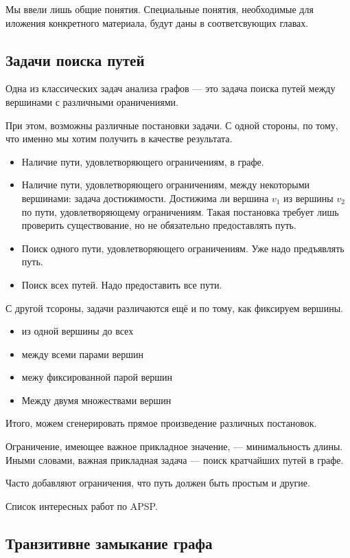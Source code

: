 Мы ввели лишь общие понятия.
Специальные понятия, необходимые для иложения конкретного материала, будут даны в соответсвующих главах.


\subsection{Задачи поиска путей}

Одна из классических задач анализа графов --- это задача поиска путей между вершинами с различными ораничениями.

При этом, возможны различные постановки задачи.
С одной стороны, по тому, что именно мы хотим получить в качестве результата.
\begin{itemize}
\item Наличие пути, удовлетворяющего ограничениям, в графе.
\item Наличие пути, удовлетворяющего ограничениям, между некоторыми вершинами: задача достижимости. 
      Достижима ли вершина $v_1$ из вершины $v_2$ по пути, удовлетворяющему ограничениям.
      Такая постановка требует лишь проверить существование, но не обязательно предоставлять путь.
\item Поиск одного пути, удовлетворяющего ограничениям. Уже надо предъявлять путь.
\item Поиск всех путей. Надо предоставить все пути.
\end{itemize}

С другой тсороны, задачи различаются ещё и по тому, как фиксируем вершины.
\begin{itemize}
\item из одной вершины до всех
\item между всеми парами вершин
\item межу фиксированной парой вершин
\item Между двумя множествами вершин
\end{itemize}

Итого, можем сгенерировать прямое произведение различных постановок.

Ограничение, имеющее важное прикладное значение, --- минимальность длины. 
Иными словами, важная прикладная задача --- поиск кратчайших путей в графе.

Часто добавляют ограничения, что путь должен быть простым и другие.

Список интересных работ по APSP.

\subsection{Транзитивне замыкание графа}

